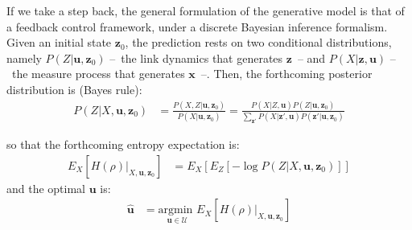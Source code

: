 \documentclass{article} %
\begin{document}
If we take a step back, the general formulation of the generative model is that of a feedback control framework, under a discrete Bayesian inference formalism. %
Given an initial state $\boldsymbol{z}_0$, the prediction rests on two conditional distributions, namely $P(Z|\boldsymbol{u},\boldsymbol{z}_0)$ --~the link dynamics that generates $\boldsymbol{z}$~-- and $P(X|\boldsymbol{z},\boldsymbol{u})$ --~the measure process that generates $\boldsymbol{x}$~--. %
Then, the forthcoming posterior distribution is (Bayes rule):
	\begin{align}
	P(Z|X,\boldsymbol{u},\boldsymbol{z}_0) &= \frac{P(X,Z|\boldsymbol{u},\boldsymbol{z}_0)}{P(X|\boldsymbol{u},\boldsymbol{z}_0)}
	= \frac{P(X|Z,\boldsymbol{u}) P(Z|\boldsymbol{u},\boldsymbol{z}_0)}{\sum_{\boldsymbol{z}'}P(X|\boldsymbol{z}',\boldsymbol{u}) P(\boldsymbol{z}'|\boldsymbol{u},\boldsymbol{z}_0)}\label{eq:post}
	\end{align}
	
	so that the forthcoming entropy expectation is:
	\begin{align}
	E_{X}\left[H(\rho)|_{X, \boldsymbol{u}, \boldsymbol{z}_0}\right] &=  E_{X}\left[E_{Z}\left[-\log  P(Z|X,\boldsymbol{u},\boldsymbol{z}_0)\right]\right]
	\end{align}
	and the optimal $\boldsymbol{u}$ is:
	\begin{align}
	\hat{\boldsymbol{u}} &= \underset{\boldsymbol{u} \in \mathcal{U}}{\text{argmin }} E_{X}\left[H(\rho)|_{X, \boldsymbol{u}, \boldsymbol{z}_0}\right]
	\end{align}
	
\end{document}
